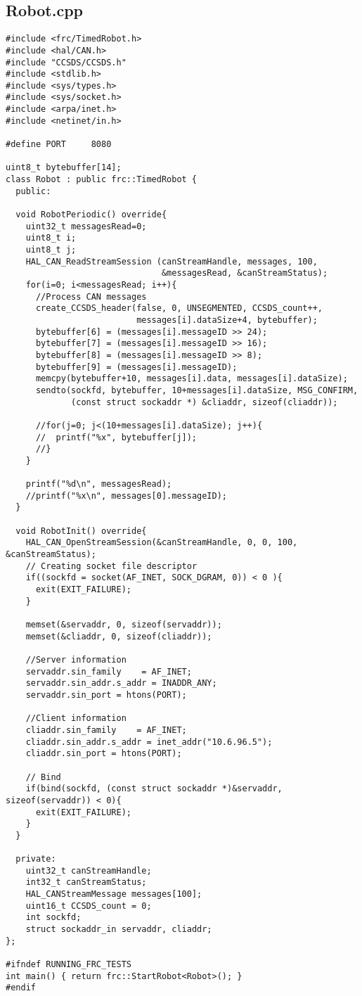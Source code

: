 \documentclass[12pt]{article}
\begin{document}
\subsection{Robot.cpp}
\begin{verbatim}
#include <frc/TimedRobot.h>
#include <hal/CAN.h>
#include "CCSDS/CCSDS.h"
#include <stdlib.h> 
#include <sys/types.h> 
#include <sys/socket.h> 
#include <arpa/inet.h> 
#include <netinet/in.h> 

#define PORT     8080 

uint8_t bytebuffer[14];
class Robot : public frc::TimedRobot {
  public:

  void RobotPeriodic() override{
    uint32_t messagesRead=0;
    uint8_t i;
    uint8_t j;
    HAL_CAN_ReadStreamSession (canStreamHandle, messages, 100, 
                               &messagesRead, &canStreamStatus);
    for(i=0; i<messagesRead; i++){
      //Process CAN messages
      create_CCSDS_header(false, 0, UNSEGMENTED, CCSDS_count++, 
                          messages[i].dataSize+4, bytebuffer);
      bytebuffer[6] = (messages[i].messageID >> 24);
      bytebuffer[7] = (messages[i].messageID >> 16);
      bytebuffer[8] = (messages[i].messageID >> 8);
      bytebuffer[9] = (messages[i].messageID);
      memcpy(bytebuffer+10, messages[i].data, messages[i].dataSize);
      sendto(sockfd, bytebuffer, 10+messages[i].dataSize, MSG_CONFIRM, 
             (const struct sockaddr *) &cliaddr, sizeof(cliaddr)); 

      //for(j=0; j<(10+messages[i].dataSize); j++){
      //  printf("%x", bytebuffer[j]);
      //}
    }

    printf("%d\n", messagesRead);
    //printf("%x\n", messages[0].messageID);
  }

  void RobotInit() override{
    HAL_CAN_OpenStreamSession(&canStreamHandle, 0, 0, 100, &canStreamStatus);
    // Creating socket file descriptor 
    if((sockfd = socket(AF_INET, SOCK_DGRAM, 0)) < 0 ){ 
      exit(EXIT_FAILURE); 
    } 

    memset(&servaddr, 0, sizeof(servaddr)); 
    memset(&cliaddr, 0, sizeof(cliaddr)); 

    //Server information 
    servaddr.sin_family    = AF_INET;
    servaddr.sin_addr.s_addr = INADDR_ANY; 
    servaddr.sin_port = htons(PORT); 

    //Client information 
    cliaddr.sin_family    = AF_INET;
    cliaddr.sin_addr.s_addr = inet_addr("10.6.96.5"); 
    cliaddr.sin_port = htons(PORT); 

    // Bind
    if(bind(sockfd, (const struct sockaddr *)&servaddr, sizeof(servaddr)) < 0){  
      exit(EXIT_FAILURE); 
    }       
  }

  private:
    uint32_t canStreamHandle;
    int32_t canStreamStatus;
    HAL_CANStreamMessage messages[100];
    uint16_t CCSDS_count = 0;
    int sockfd;
    struct sockaddr_in servaddr, cliaddr; 
};

#ifndef RUNNING_FRC_TESTS
int main() { return frc::StartRobot<Robot>(); }
#endif
\end{verbatim}
\end{document}
